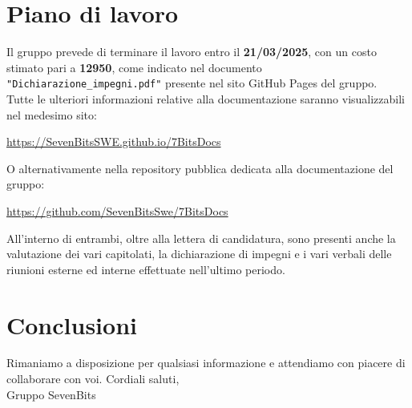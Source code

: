 \documentclass[10pt]{article}
\begin{document}
\section{Piano di lavoro}
Il gruppo prevede di terminare il lavoro entro il \textbf{21/03/2025}, con un costo stimato pari a \textbf{12950\texteuro}, come indicato nel documento 
\texttt{"Dichiarazione\_impegni.pdf"} presente nel sito GitHub Pages del gruppo.\\
Tutte le ulteriori informazioni relative alla documentazione saranno visualizzabili nel medesimo sito:\\
\begin{center}
\url{https://SevenBitsSWE.github.io/7BitsDocs}\\
\end{center}
O alternativamente nella repository pubblica dedicata alla documentazione del gruppo:
\begin{center}
\url{https://github.com/SevenBitsSwe/7BitsDocs}\\    
\end{center}
\vspace{2mm}
All'interno di entrambi, oltre alla lettera di candidatura, sono presenti anche la valutazione dei vari capitolati, la dichiarazione di impegni e i vari verbali delle 
riunioni esterne ed interne effettuate nell'ultimo periodo.


\section{Conclusioni}
Rimaniamo a disposizione per qualsiasi informazione e attendiamo con piacere di collaborare con voi.
\vspace{2mm}
\newline
Cordiali saluti,\\
Gruppo SevenBits
\end{document}
